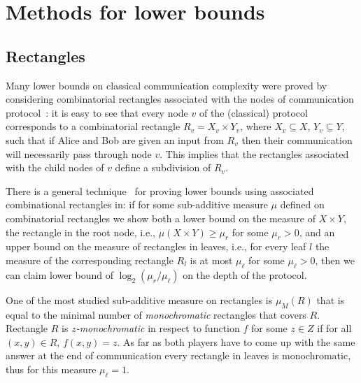 \section{Methods for lower bounds}\label{sec:methods}
\subsection{Rectangles}\label{subsec:rectangles}
Many lower bounds on classical communication complexity were proved by considering
combinatorial rectangles associated with the nodes of communication protocol~\cite{KN97}: 
it is easy to see that every node $v$ of the (classical)
protocol corresponds to a combinatorial rectangle $R_v = X_v\times Y_v$, 
where $X_v\subseteq X$, $Y_v\subseteq Y$, such that if Alice and Bob are given an input from $R_v$
then their communication will necessarily pass through node $v$. This implies that the rectangles associated with the child nodes of $v$ define a subdivision of $R_v$.

There is a general technique~\cite{KN97} for proving lower bounds using associated combinational rectangles in: if for some sub-additive measure  $\mu$ defined on combinatorial rectangles we show both a lower bound on the measure of $X\times Y$, the rectangle in the root node, i.e., $\mu(X\times Y)\ge \mu_r$ for some $\mu_r>0$, and
an upper bound on the measure of rectangles in leaves, i.e., for every leaf $l$ the measure
of the corresponding rectangle $R_l$ is at most $\mu_\ell$ for some $\mu_\ell>0$, 
then we can claim lower bound of $\log_2(\mu_r/\mu_\ell)$ on the depth of the protocol.

One of the most studied sub-additive measure on rectangles is $\mu_M(R)$ that is 
equal to the minimal number of \emph{monochromatic} 
rectangles that covers $R$. Rectangle $R$ is \emph{$z$-monochromatic} in respect to function $f$ 
for some $z\in Z$ if for all $(x,y)\in R$, $f(x,y) = z$.
As far as both players have to come up with the same answer at the end of 
communication every rectangle in leaves is monochromatic, thus for this measure $\mu_\ell = 1$.

